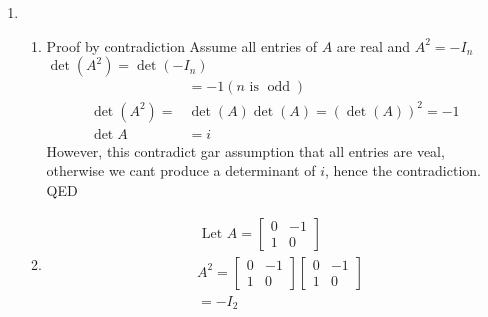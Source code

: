 \documentclass[11pt]{article}
\begin{document}
\begin{enumerate}[{\bf Q1.}]
		\item
		\begin{enumerate}
			\item 
			Proof by contradiction \newline
			Assume all entries of $A$ are real and $A^2=-I_n$ \newline 
			$\operatorname{det}\left(A^2\right)=\operatorname{det}\left(-I_n\right)$
			$$
			\begin{aligned}
			& =-1(n \text { is } \operatorname{odd}) \\
			\operatorname{det}\left(A^2\right)= & \operatorname{det}(A) \operatorname{det}(A)=(\operatorname{det}(A))^2=-1 \\
			\operatorname{det} A & =i
			\end{aligned}
			$$
			However, this contradict gar assumption that all entries are veal, otherwise we cant produce a determinant of $i$, hence the contradiction. \newline
			QED

			\item 
			\begin{equation}
				\begin{aligned}
				& \text { Let } A=\left[\begin{array}{cc}
				0 & -1 \\
				1 & 0
				\end{array}\right] \\
				& A^2=\left[\begin{array}{cc}
				0 & -1 \\
				1 & 0
				\end{array}\right]\left[\begin{array}{cc}
				0 & -1 \\
				1 & 0
				\end{array}\right] \\
				& =-I_2 \\
				&
				\end{aligned}
				\end{equation}
				

\end{enumerate}
\end{enumerate}
\end{document}
